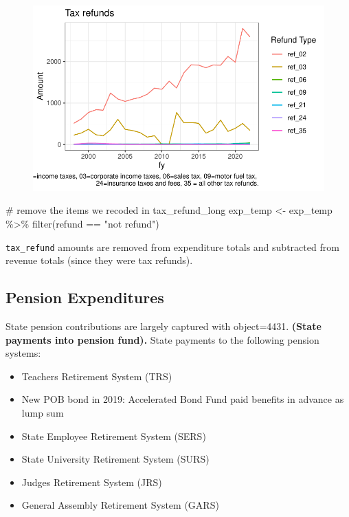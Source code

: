 \documentclass[
  letterpaper,
  DIV=11,
  numbers=noendperiod]{scrreport}
\newenvironment{Shaded}{\begin{snugshade}}{\end{snugshade}}
\newcommand{\CommentTok}[1]{\textcolor[rgb]{0.37,0.37,0.37}{#1}}
\newcommand{\FunctionTok}[1]{\textcolor[rgb]{0.28,0.35,0.67}{#1}}
\newcommand{\NormalTok}[1]{\textcolor[rgb]{0.00,0.23,0.31}{#1}}
\newcommand{\OtherTok}[1]{\textcolor[rgb]{0.00,0.23,0.31}{#1}}
\newcommand{\SpecialCharTok}[1]{\textcolor[rgb]{0.37,0.37,0.37}{#1}}
\newcommand{\StringTok}[1]{\textcolor[rgb]{0.13,0.47,0.30}{#1}}
\providecommand{\tightlist}{%
  \setlength{\itemsep}{0pt}\setlength{\parskip}{0pt}}\usepackage{longtable,booktabs,array}
\begin{document}
\begin{figure}[H]

{\centering \includegraphics{./Everything_files/figure-pdf/tax-refunds-1.pdf}

}

\end{figure}

\begin{Shaded}
\begin{Highlighting}[]
\CommentTok{\# remove the items we recoded in tax\_refund\_long}
\NormalTok{exp\_temp }\OtherTok{\textless{}{-}}\NormalTok{ exp\_temp }\SpecialCharTok{\%\textgreater{}\%} \FunctionTok{filter}\NormalTok{(refund }\SpecialCharTok{==} \StringTok{"not refund"}\NormalTok{)}
\end{Highlighting}
\end{Shaded}

\texttt{tax\_refund} amounts are removed from expenditure totals and
subtracted from revenue totals (since they were tax refunds).

\hypertarget{pension-expenditures}{%
\subsection{Pension Expenditures}\label{pension-expenditures}}

State pension contributions are largely captured with object=4431.
\textbf{(State payments into pension fund).} State payments to the
following pension systems:

\begin{itemize}
\tightlist
\item
  Teachers Retirement System (TRS)
\item
  New POB bond in 2019: Accelerated Bond Fund paid benefits in advance
  as lump sum
\item
  State Employee Retirement System (SERS)
\item
  State University Retirement System (SURS)
\item
  Judges Retirement System (JRS)
\item
  General Assembly Retirement System (GARS)
\end{itemize}
\end{document}
